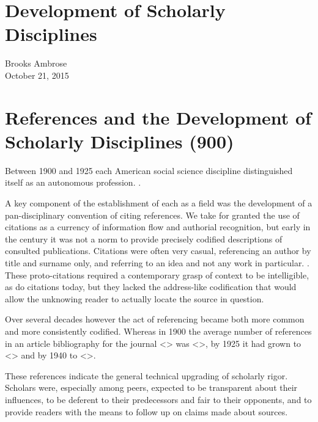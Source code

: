 \documentclass[]{article}
\date{}
\begin{document}
\section{Development of Scholarly
Disciplines}\label{development-of-scholarly-disciplines}

Brooks Ambrose\\
October 21, 2015

\section{References and the Development of Scholarly Disciplines
(900)}\label{references-and-the-development-of-scholarly-disciplines-900}

Between 1900 and 1925 each American social science discipline
distinguished itself as an autonomous profession. .

A key component of the establishment of each as a field was the
development of a pan-disciplinary convention of citing references. We
take for granted the use of citations as a currency of information flow
and authorial recognition, but early in the century it was not a norm to
provide precisely codified descriptions of consulted publications.
Citations were often very casual, referencing an author by title and
surname only, and referring to an idea and not any work in particular. .
These proto-citations required a contemporary grasp of context to be
intelligible, as do citations today, but they lacked the address-like
codification that would allow the unknowing reader to actually locate
the source in question.

Over several decades however the act of referencing became both more
common and more consistently codified. Whereas in 1900 the average
number of references in an article bibliography for the journal
\textless{}\textgreater{} was \textless{}\textgreater{}, by 1925 it had
grown to \textless{}\textgreater{} and by 1940 to
\textless{}\textgreater{}.

These references indicate the general technical upgrading of scholarly
rigor. Scholars were, especially among peers, expected to be transparent
about their influences, to be deferent to their predecessors and fair to
their opponents, and to provide readers with the means to follow up on
claims made about sources.
\end{document}
